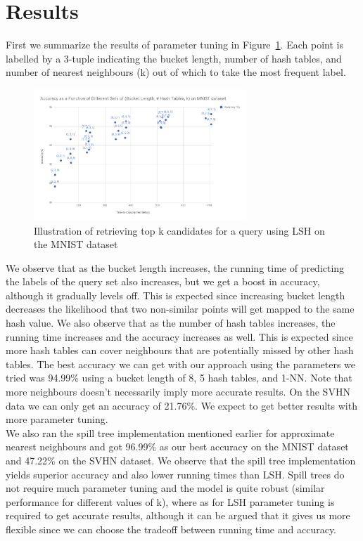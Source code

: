\documentclass[letterpaper,twocolumn,10pt]{article}
\theoremstyle{definition}
\begin{document}
\section{Results}

First we summarize the results of parameter tuning in Figure~\ref{figure:tuning}. Each 
point is labelled by a 3-tuple indicating the bucket length, number of hash tables, and number of 
nearest neighbours (k) out of which to take the most frequent label.

\begin{figure}[t]
	\center
	\includegraphics[width=8cm]{param-tuning.png}
	\caption{Illustration of retrieving top k candidates for a query using LSH on the MNIST dataset}
	\label{figure:tuning}
\end{figure}

We observe that as the bucket length increases, the running time of predicting the labels of the query 
set also increases, but we get a boost in accuracy, although it gradually levels off. This is expected 
since increasing bucket length decreases the likelihood that two non-similar points will get mapped to 
the same hash value. We also observe that as the number of hash tables increases, the running time 
increases and the accuracy increases as well. This is expected since more hash tables can cover 
neighbours that are potentially missed by other hash tables. The best accuracy we can get with our 
approach using the parameters we tried was 94.99\% using a bucket length of 8, 5 hash tables, and 
1-NN. 
Note that more neighbours doesn't necessarily imply more accurate results. On the SVHN data we can 
only get an accuracy of 21.76\%. We expect to get better results with more parameter tuning. \\

We also ran the spill tree implementation mentioned earlier for approximate nearest neighbours and got 
96.99\% as our best accuracy on the MNIST dataset and 47.22\% on the SVHN dataset. We observe 
that the spill tree implementation yields superior accuracy and also lower running times than LSH. Spill 
trees do not require much parameter tuning and the model is quite robust (similar performance for 
different values of k), where as for LSH parameter tuning is required to get accurate results, although 
it can be argued that it gives us more flexible since we can choose the tradeoff between running time 
and accuracy. \\
\end{document}
